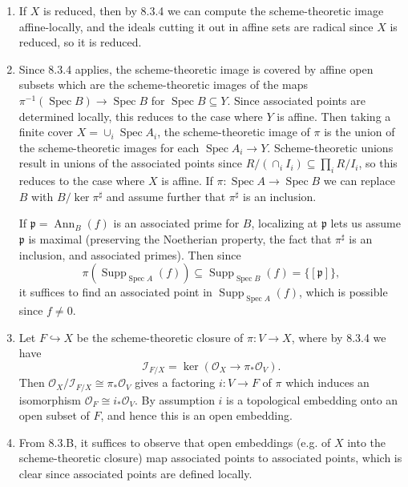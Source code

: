 \documentclass{report}
\newcommand{\p}{\mathfrak{p}}
\newcommand{\I}{\mathscr{I}}
\renewcommand{\O}{\mathscr{O}} %
\DeclareMathOperator{\Supp}{Supp}
\DeclareMathOperator{\Spec}{Spec}
\DeclareMathOperator{\Ann}{Ann}
\begin{document}
\begin{enumerate}[label=\textbf{8.3.\Alph*.}]
	\item If $X$ is reduced, then by 8.3.4 we can compute the scheme-theoretic
	      image affine-locally, and the ideals cutting it out in affine sets are
	      radical since $X$ is reduced, so it is reduced.

	\item Since 8.3.4 applies, the scheme-theoretic image is covered by affine
	      open subsets which are the scheme-theoretic images of the maps
	      $\pi^{-1}(\Spec B)\to\Spec B$ for $\Spec B\subseteq Y$. Since associated
	      points are determined locally, this reduces to the case where $Y$ is
	      affine. Then taking a finite cover $X=\cup_i\Spec A_i$, the
	      scheme-theoretic image of $\pi$ is the union of the scheme-theoretic
	      images for each $\Spec A_i\to Y$. Scheme-theoretic unions result in
	      unions of the associated points since
	      $R/(\cap_iI_i)\subseteq\prod_iR/I_i$, so this reduces to the case where
	      $X$ is affine. If $\pi:\Spec A\to\Spec B$ we can replace $B$ with
	      $B/\ker\pi^\sharp$ and assume further that $\pi^\sharp$ is an inclusion.

	      If $\p=\Ann_B(f)$ is an associated prime for $B$, localizing at $\p$
	      lets us assume $\p$ is maximal (preserving the Noetherian property, the
	      fact that $\pi^\sharp$ is an inclusion, and associated primes). Then
	      since
	      \begin{equation*}
		      \pi(\Supp_{\Spec A}(f))\subseteq\Supp_{\Spec B}(f)=\{[\p]\},
	      \end{equation*}
	      it suffices to find an associated point in $\Supp_{\Spec A}(f)$, which
	      is possible since $f\ne0$.

	\item Let $F\hookrightarrow X$ be the scheme-theoretic closure of
	      $\pi:V\to X$, where by 8.3.4 we have
	      \begin{equation*}
		      \I_{F/X}=\ker(\O_X\to\pi_*\O_V).
	      \end{equation*}
	      Then $\O_X/\I_{F/X}\cong\pi_*\O_V$ gives a factoring $i:V\to F$ of $\pi$
	      which induces an isomorphism $\O_F\cong i_*\O_V$. By assumption $i$ is a
	      topological embedding onto an open subset of $F$, and hence this is an
	      open embedding.

	\item From 8.3.B, it suffices to observe that open embeddings (e.g. of $X$
	      into the scheme-theoretic closure) map associated points to associated
	      points, which is clear since associated points are defined locally.


\end{enumerate}
\end{document}
